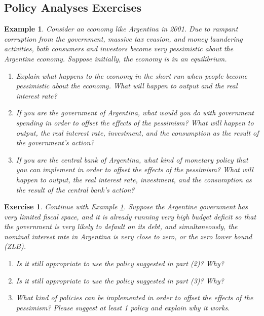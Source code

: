 \documentclass[12pt]{article}
\newtheorem{example}{Example}
\newtheorem{exercise}{Exercise}
\begin{document}
\subsection*{Policy Analyses Exercises}
\begin{example}\label{eg:arg}
    Consider an economy like Argentina in 2001. Due to rampant corruption from the government, massive tax evasion, and money laundering activities, both consumers and investors become very pessimistic about the Argentine economy. Suppose initially, the economy is in an equilibrium. 
    \begin{enumerate}[label=(\arabic*)]
        \item Explain what happens to the economy in the short run when people become pessimistic about the economy. What will happen to output and the real interest rate?
        \item If you are the government of Argentina, what would you do with government spending in order to offset the effects of the pessimism? What will happen to output, the real interest rate, investment, and the consumption as the result of the government's action?
        \item If you are the central bank of Argentina, what kind of monetary policy that you can implement in order to offset the effects of the pessimism? What will happen to output, the real interest rate, investment, and the consumption as the result of the central bank's action?
    \end{enumerate}
\end{example}

\begin{exercise}
    Continue with Example \ref{eg:arg}. Suppose the Argentine government has very limited fiscal space, and it is already running very high budget deficit so that the government is very likely to default on its debt, and simultaneously, the nominal interest rate in Argentina is very close to zero, or the zero lower bound (ZLB). 
    \begin{enumerate}[label=(\arabic*)]
        \item Is it still appropriate to use the policy suggested in part (2)? Why?
        \item Is it still appropriate to use the policy suggested in part (3)? Why?
        \item What kind of policies can be implemented in order to offset the effects of the pessimism? Please suggest at least 1 policy and explain why it works.
    \end{enumerate}
\end{exercise}
\end{document}
